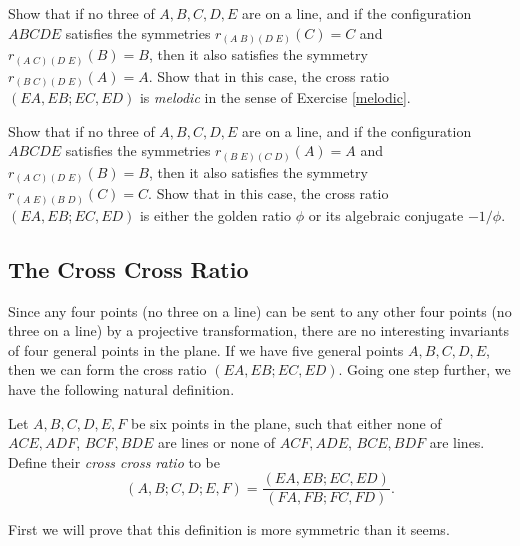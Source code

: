 \begin{exer} Show that if no three of $A,B,C,D,E$ are on a line, and if the configuration $ABCDE$ satisfies the symmetries $r_{(A\;B)(D\;E)}(C) = C$ and $r_{(A\;C)(D\;E)}(B) = B$, then it also satisfies the symmetry $r_{(B\;C)(D\;E)}(A) = A$. Show that in this case, the cross ratio $(EA,EB;EC,ED)$ is \emph{melodic} in the sense of Exercise \ref{melodic}.
\end{exer}

\begin{exer} Show that if no three of $A,B,C,D,E$ are on a line, and if the configuration $ABCDE$ satisfies the symmetries $r_{(B\;E)(C\;D)}(A) = A$ and $r_{(A\;C)(D\;E)}(B) = B$, then it also satisfies the symmetry $r_{(A\;E)(B\;D)}(C) = C$. Show that in this case, the cross ratio $(EA,EB;EC,ED)$ is either the golden ratio $\phi$ or its algebraic conjugate $-1/\phi$.
\end{exer}

\subsection{The Cross Cross Ratio}

Since any four points (no three on a line) can be sent to any other four points (no three on a line) by a projective transformation, there are no interesting invariants of four general points in the plane. If we have five general points $A,B,C,D,E$, then we can form the cross ratio $(EA,EB;EC,ED)$. Going one step further, we have the following natural definition.

\begin{defn} Let $A,B,C,D,E,F$ be six points in the plane, such that either none of $ACE, ADF$, $BCF, BDE$ are lines or none of $ACF, ADE$, $BCE, BDF$ are lines. Define their \emph{cross cross ratio} to be
\[
(A,B;C,D;E,F) = \frac{(EA,EB;EC,ED)}{(FA,FB;FC,FD)}.
\]
\end{defn}

First we will prove that this definition is more symmetric than it seems.

